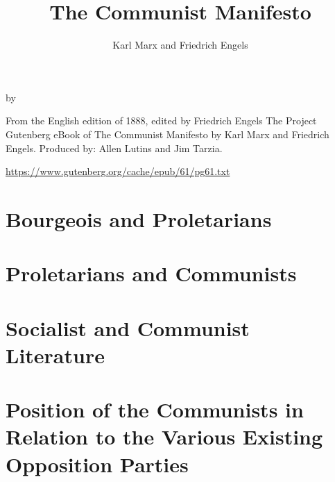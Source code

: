 \documentclass[fontsize=12pt,a5paper,BCOR=12mm,DIV=calc,twoside]{scrbook}
\title{The Communist Manifesto}
\author{Karl Marx and Friedrich Engels}
\date{}
\begin{document}

\makeatletter
\begin{titlepage}
	\setlength{\parindent}{0pt}
	\vspace*{.15\textheight}
	\bigbreak
	{\Huge \slshape	 \@title \par}
	\medbreak
	{\large by \scshape \@author\par}
	\bigbreak
	{\small From the English edition of 1888, edited by Friedrich Engels}
        \vfill
        {\small The Project Gutenberg eBook of The Communist Manifesto by Karl Marx and Friedrich Engels. Produced by: Allen Lutins and Jim Tarzia.}\par
        {\tiny \url{https://www.gutenberg.org/cache/epub/61/pg61.txt}}
\end{titlepage}
\makeatother

\tableofcontents
\mainmatter


\chapter*{}
\chaptermark{}


\chapter{Bourgeois and Proletarians}


\chapter{Proletarians and Communists}


\chapter{Socialist and Communist Literature}


\chapter[Position of the Communists]{Position of the Communists in Relation to the Various Existing Opposition Parties}

%
\end{document}
